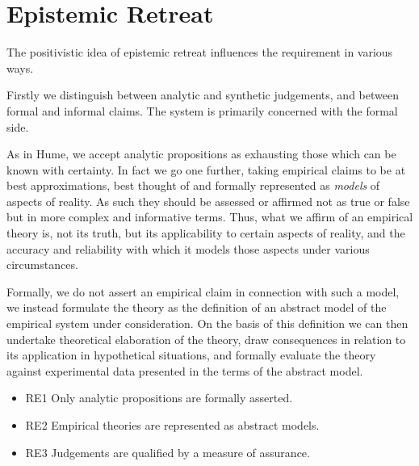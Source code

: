 \section{Epistemic Retreat}

The positivistic idea of epistemic retreat influences the requirement
in various ways.

Firstly we distinguish between analytic and synthetic judgements, and
between formal and informal claims.
The system is primarily concerned with the formal side.

As in Hume, we accept analytic propositions as exhausting those which
can be known with certainty.
In fact we go one further, taking empirical claims to be at best
approximations, best thought of and formally represented as
\emph{models} of aspects of reality.
As such they should be assessed or affirmed not as true or false but
in more complex and informative terms.
Thus, what we affirm of an empirical theory is, not its truth, but its
applicability to certain aspects of reality, and the accuracy and
reliability with which it models those aspects under various
circumstances. 

Formally, we do not assert an empirical claim in connection with such
a model, we instead formulate the theory as the definition of an abstract model
of the empirical system under consideration.
On the basis of this definition we can then undertake theoretical
elaboration of the theory, draw consequences in relation to its
application in hypothetical situations, and formally evaluate the
theory against experimental data presented in the terms of the
abstract model.


\begin{itemize}
\item{RE1} Only analytic propositions are formally asserted.
\item{RE2} Empirical theories are represented as abstract models.
\item{RE3} Judgements are qualified by a measure of assurance. 
\end{itemize}







